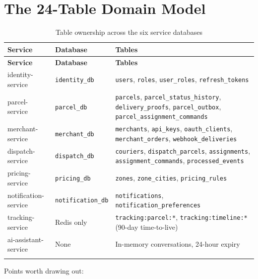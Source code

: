 \documentclass[11pt,a4paper,oneside,openany]{report}
\newcommand{\code}[1]{\texttt{\small #1}}
\begin{document}
\section{The 24-Table Domain Model}
\begin{center}
\small
\begin{longtable}{@{}p{3.4cm}p{2.6cm}p{8.3cm}@{}}
\toprule
\textbf{Service} & \textbf{Database} & \textbf{Tables} \\
\midrule
\endfirsthead
\toprule
\textbf{Service} & \textbf{Database} & \textbf{Tables} \\
\midrule
\endhead
identity-service & \code{identity\_db} & \code{users}, \code{roles}, \code{user\_roles},
\code{refresh\_tokens} \\
\addlinespace
parcel-service & \code{parcel\_db} & \code{parcels}, \code{parcel\_status\_history},
\code{delivery\_proofs}, \code{parcel\_outbox}, \code{parcel\_assignment\_commands} \\
\addlinespace
merchant-service & \code{merchant\_db} & \code{merchants}, \code{api\_keys},
\code{oauth\_clients}, \code{merchant\_orders}, \code{webhook\_deliveries} \\
\addlinespace
dispatch-service & \code{dispatch\_db} & \code{couriers}, \code{dispatch\_parcels},
\code{assignments}, \code{assignment\_commands}, \code{processed\_events} \\
\addlinespace
pricing-service & \code{pricing\_db} & \code{zones}, \code{zone\_cities}, \code{pricing\_rules} \\
\addlinespace
notification-service & \code{notification\_db} & \code{notifications},
\code{notification\_preferences} \\
\addlinespace
tracking-service & Redis only & \code{tracking:parcel:*}, \code{tracking:timeline:*}
(90-day time-to-live) \\
\addlinespace
ai-assistant-service & None & In-memory conversations, 24-hour expiry \\
\bottomrule
\caption{Table ownership across the six service databases}\label{tab:tables}
\end{longtable}
\end{center}

Points worth drawing out:
\end{document}
